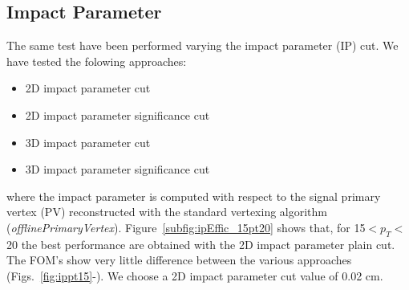 \subsection{Impact Parameter}

The same test have been performed varying the impact parameter (IP) cut.
We have tested the folowing approaches:
\begin{itemize}
\item 2D impact parameter cut
\item 2D impact parameter significance cut
\item 3D impact parameter cut
\item 3D impact parameter significance cut
\end{itemize}
where the impact parameter is computed with respect to the signal primary vertex (PV) reconstructed with the standard vertexing 
algorithm (\emph{offlinePrimaryVertex}).
Figure~\ref{subfig:ipEffic_15pt20} shows that, for 15$<p_T<$20 the best performance are obtained with the 2D impact parameter plain cut.
The FOM's show very little difference between the various approaches (Figs.~\ref{fig:ippt15}-).
We choose a 2D impact parameter cut value of 0.02 cm.

